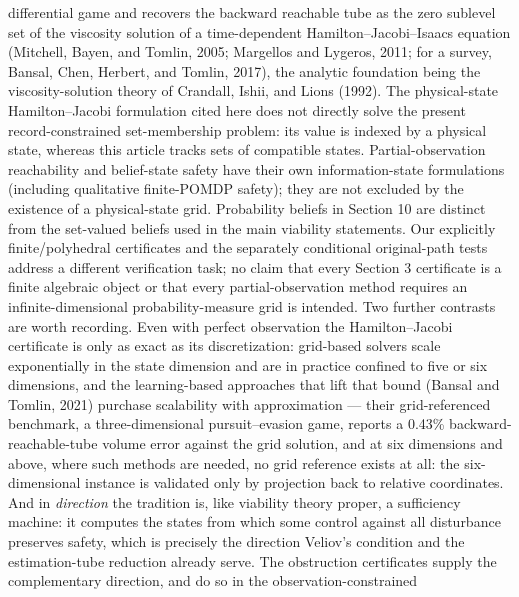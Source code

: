 \documentclass[10pt,twocolumn]{article}
\theoremstyle{definition}
\begin{document}
differential game and recovers the backward reachable tube as the zero sublevel set of the
viscosity solution of a time-dependent Hamilton--Jacobi--Isaacs equation (Mitchell, Bayen,
and Tomlin, 2005; Margellos and Lygeros, 2011; for a survey, Bansal, Chen, Herbert, and
Tomlin, 2017), the analytic foundation being the viscosity-solution theory of Crandall, Ishii,
and Lions (1992).  The physical-state Hamilton--Jacobi formulation cited here does not directly solve the present record-constrained set-membership problem: its value is indexed by a physical state, whereas this article tracks sets of compatible states. Partial-observation reachability and belief-state safety have their own information-state formulations (including qualitative finite-POMDP safety); they are not excluded by the existence of a physical-state grid. Probability beliefs in Section 10 are distinct from the set-valued beliefs used in the main viability statements. Our explicitly finite/polyhedral certificates and the separately conditional original-path tests address a different verification task; no claim that every Section 3 certificate is a finite algebraic object or that every partial-observation method requires an infinite-dimensional probability-measure grid is intended. Two further contrasts are worth
recording.  Even with perfect observation the Hamilton--Jacobi certificate is only as exact
as its discretization: grid-based solvers scale exponentially in the state dimension and are
in practice confined to five or six dimensions, and the learning-based approaches that lift
that bound (Bansal and Tomlin, 2021) purchase scalability with approximation --- their
grid-referenced benchmark, a three-dimensional pursuit--evasion game, reports a 0.43\%
backward-reachable-tube volume error against the grid solution, and at six dimensions and
above, where such methods are needed, no grid reference exists at all: the six-dimensional
instance is validated only by projection back to relative coordinates.  And in \emph{direction} the tradition
is, like viability theory proper, a sufficiency machine: it computes the states from which
some control against all disturbance preserves safety, which is precisely the direction
Veliov's condition and the estimation-tube reduction already serve.  The obstruction
certificates supply the complementary direction, and do so in the observation-constrained
\end{document}
